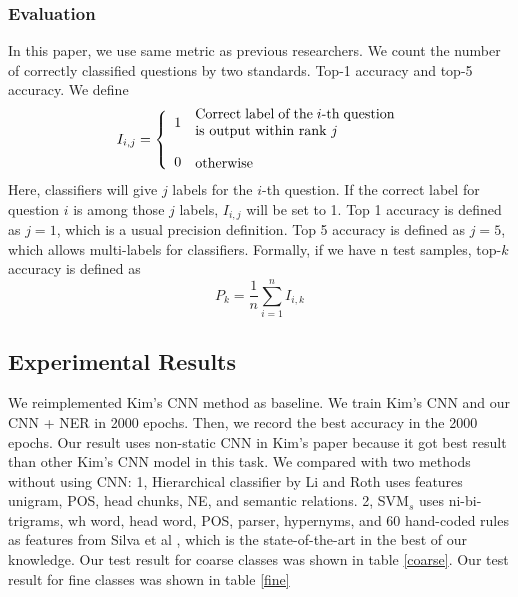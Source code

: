 \documentclass[10pt,twocolumn,letterpaper]{article}
\begin{document}
\subsubsection{Evaluation}
In this paper, we use same metric as previous researchers. We count the number of correctly classified questions by two standards. Top-1 accuracy and top-5 accuracy. We define
$$ 
I_{i,j} = 
\left\{ 
  \begin{array}{ll}
    1 & \parbox{5cm}{Correct label of the $i$-th question is output within rank $j$ }\\
    \\
    0 & \parbox{3cm}{otherwise}
  \end{array} 
\right. 
$$
Here, classifiers will give $j$ labels for the $i$-th question. If the correct label for question $i$ is among those $j$ labels, $I_{i,j}$ will be set to 1. Top 1 accuracy is defined as $j = 1$, which is a usual precision definition. Top 5 accuracy is defined as $j = 5$, which allows multi-labels for classifiers. Formally, if we have n test samples, top-$k $ accuracy is defined as
$$
P_k = \frac{1}{n}\sum_{i=1}^{n} I_{i,k} 
$$

\subsection{Experimental Results}
We reimplemented Kim's CNN method as baseline. We train Kim's CNN and our CNN + NER in 2000 epochs. Then, we record the best accuracy in the 2000 epochs. Our result uses non-static CNN in Kim's paper because it got best result than other Kim's CNN model in this task. We compared with two methods without using CNN: 1, Hierarchical classifier by Li and Roth\cite{li2002learning} uses features unigram, POS, head chunks, NE, and semantic relations. 2, SVM$_s$ uses ni-bi-trigrams, wh word, head word, POS, parser, hypernyms, and 60 hand-coded rules as features from Silva et al \cite{silva2011symbolic}, which is the state-of-the-art in the best of our knowledge. Our test result for coarse classes was shown in table \ref{coarse}. Our test result for fine classes was shown in table \ref{fine}

\begin{table}
\caption{Top-1 and top-5 accuracy for TREC coarse question types. }
\label{coarse}
\end{table}
\end{document}
